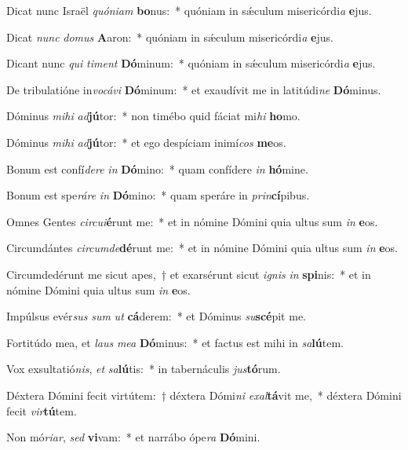 \item Dicat nunc Israël \textit{quón}\textit{i}\textit{am} \textbf{bo}nus:~* quóniam in sǽculum misericórdi\textit{a} \textbf{e}jus.
\item Dicat \textit{nunc} \textit{do}\textit{mus} \textbf{A}aron:~* quóniam in sǽculum misericórdi\textit{a} \textbf{e}jus.
\item Dicant nunc \textit{qui} \textit{ti}\textit{ment} \textbf{Dó}minum:~* quóniam in sǽculum misericórdi\textit{a} \textbf{e}jus.
\item De tribulatióne in\textit{vo}\textit{cá}\textit{vi} \textbf{Dó}minum:~* et exaudívit me in latitúdi\textit{ne} \textbf{Dó}minus.
\item Dóminus \textit{mi}\textit{hi} \textit{ad}\textbf{jú}tor:~* non timébo quid fáciat mi\textit{hi} \textbf{ho}mo.
\item Dóminus \textit{mi}\textit{hi} \textit{ad}\textbf{jú}tor:~* et ego despíciam inimí\textit{cos} \textbf{me}os.
\item Bonum est confí\textit{de}\textit{re} \textit{in} \textbf{Dó}mino:~* quam confídere \textit{in} \textbf{hó}mine.
\item Bonum est spe\textit{rá}\textit{re} \textit{in} \textbf{Dó}mino:~* quam speráre in \textit{prin}\textbf{cí}pibus.
\item Omnes Gentes \textit{cir}\textit{cu}\textit{i}\textbf{é}runt me:~* et in nómine Dómini quia ultus sum \textit{in} \textbf{e}os.
\item Circumdántes \textit{cir}\textit{cum}\textit{de}\textbf{dé}runt me:~* et in nómine Dómini quia ultus sum \textit{in} \textbf{e}os.
\item Circumdedérunt me sicut apes,~† et exarsérunt sicut \textit{i}\textit{gnis} \textit{in} \textbf{spi}nis:~* et in nómine Dómini quia ultus sum \textit{in} \textbf{e}os.
\item Impúlsus evér\textit{sus} \textit{sum} \textit{ut} \textbf{cá}derem:~* et Dóminus \textit{su}\textbf{scé}pit me.
\item Fortitúdo mea, et \textit{laus} \textit{me}\textit{a} \textbf{Dó}minus:~* et factus est mihi in \textit{sa}\textbf{lú}tem.
\item Vox exsultatió\textit{nis}, \textit{et} \textit{sa}\textbf{lú}tis:~* in tabernáculis \textit{jus}\textbf{tó}rum.
\item Déxtera Dómini fecit virtútem:~† déxtera Dómi\textit{ni} \textit{ex}\textit{al}\textbf{tá}vit me,~* déxtera Dómini fecit \textit{vir}\textbf{tú}tem.
\item Non mó\textit{ri}\textit{ar}, \textit{sed} \textbf{vi}vam:~* et narrábo ópe\textit{ra} \textbf{Dó}mini.
